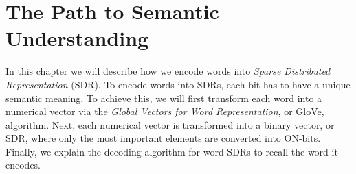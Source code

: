\chapter{The Path to Semantic Understanding}
\label{chp_nlp}
In this chapter we will describe how we encode words into \textit{Sparse Distributed Representation} (SDR). To encode words into SDRs, each bit has to have a unique semantic meaning. To achieve this, we will first transform each word into a numerical vector via the \textit{Global Vectors for Word Representation}, or GloVe, algorithm. Next, each numerical vector is transformed into a binary vector, or SDR, where only the most important elements are converted into ON-bits. Finally, we explain the decoding algorithm for word SDRs to recall the word it encodes. 



